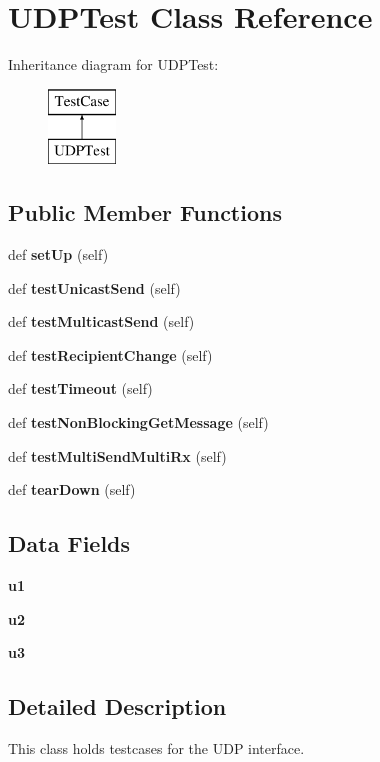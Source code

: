 \section{U\+D\+P\+Test Class Reference}
\label{classprotolibs_1_1ifaces_1_1_u_d_p_test}
Inheritance diagram for U\+D\+P\+Test\+:\begin{figure}[H]
\begin{center}
\leavevmode
\includegraphics[height=2.000000cm]{classprotolibs_1_1ifaces_1_1_u_d_p_test}
\end{center}
\end{figure}
\subsection*{Public Member Functions}
\begin{DoxyCompactItemize}
\item 
def {\bf set\+Up} (self)
\item 
def {\bf test\+Unicast\+Send} (self)
\item 
def {\bf test\+Multicast\+Send} (self)
\item 
def {\bf test\+Recipient\+Change} (self)
\item 
def {\bf test\+Timeout} (self)
\item 
def {\bf test\+Non\+Blocking\+Get\+Message} (self)
\item 
def {\bf test\+Multi\+Send\+Multi\+Rx} (self)
\item 
def {\bf tear\+Down} (self)
\end{DoxyCompactItemize}
\subsection*{Data Fields}
\begin{DoxyCompactItemize}
\item 
{\bf u1}
\item 
{\bf u2}
\item 
{\bf u3}
\end{DoxyCompactItemize}


\subsection{Detailed Description}
\begin{DoxyVerb}\internal
This class holds testcases for the UDP interface.
\end{DoxyVerb}
 

